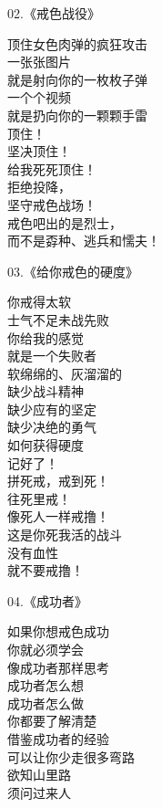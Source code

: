 \documentclass{ctexart}
\begin{document}
\begin{multicols}{2}
    \begin{center}
        02.《戒色战役》\it

        顶住女色肉弹的疯狂攻击 \\ 一张张图片 \\ 就是射向你的一枚枚子弹 \\ 一个个视频 \\ 就是扔向你的一颗颗手雷 \\ 顶住！ \\ 坚决顶住！ \\ 给我死死顶住！ \\ 拒绝投降， \\ 坚守戒色战场！ \\ 戒色吧出的是烈士， \\ 而不是孬种、逃兵和懦夫！
    \end{center}

    \begin{center}
        03.《给你戒色的硬度》\it

        你戒得太软 \\ 士气不足未战先败 \\ 你给我的感觉 \\ 就是一个失败者 \\ 软绵绵的、灰溜溜的 \\ 缺少战斗精神 \\ 缺少应有的坚定 \\ 缺少决绝的勇气
        ~\\
        如何获得硬度 \\ 记好了！ \\ 拼死戒，戒到死！ \\ 往死里戒！ \\ 像死人一样戒撸！ \\ 这是你死我活的战斗 \\ 没有血性 \\ 就不要戒撸！
    \end{center}

    \begin{center}
        04.《成功者》\it

        如果你想戒色成功 \\ 你就必须学会 \\ 像成功者那样思考 \\ 成功者怎么想 \\ 成功者怎么做 \\ 你都要了解清楚 \\ 借鉴成功者的经验 \\ 可以让你少走很多弯路 \\ 欲知山里路 \\ 须问过来人
    \end{center}


\end{multicols}
\end{document}
